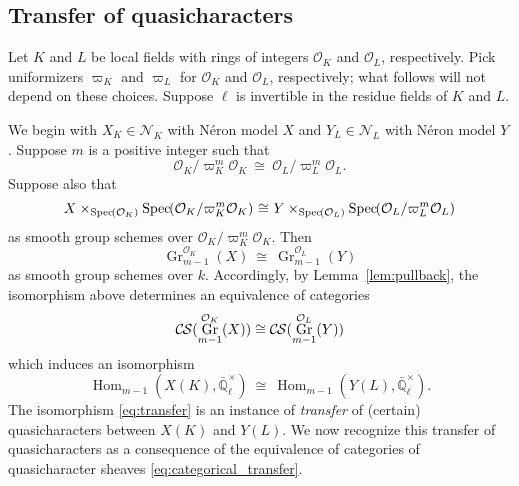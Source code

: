 \documentclass[10pt]{amsart}
\theoremstyle{plain}
\theoremstyle{definition}
\theoremstyle{remark}
\newcommand{\EE}{\mathbb{\bar Q}_\ell}
\newcommand{\OK}{\mathcal{O}_K}
\newcommand{\OL}{\mathcal{O}_L}
\newcommand{\Fq}{k}
\newcommand{\EEx}{\EE^\times}
\DeclareMathOperator{\Hom}{Hom}
\DeclareMathOperator{\Gr}{Gr}
\newcommand{\Spec}[1]{{\operatorname{Spec}\hskip-1pt( #1 )}}
\newcommand{\iso}{{\ \cong\ }}
\newcommand{\CS}{{\mathcal{C\hskip-0.8pt S}}}
\begin{document}
\subsection{Transfer of quasicharacters}\label{ssec:transfer}

Let $K$ and $L$ be local fields with rings of integers $\OK$ and $\OL$, respectively. 
Pick uniformizers $\varpi_K$ and $\varpi_L$ for $\OK$ and $\OL$, respectively;
what follows will not depend on these choices.
Suppose $\ell$ is invertible in the residue fields of $K$ and $L$.

We begin with $X_K\in \mathcal{N}_K$ with N\'eron model $X$ and $Y_{L}\in \mathcal{N}_L$ with N\'eron model $Y$.
Suppose $m$ is a positive integer such that 
\[
\OK/\varpi_K^{m}\OK \iso \OL/\varpi_L^{m}\OL.
\]
Suppose also that
\begin{equation}\label{eq:schematic_transfer}
X \times_{\Spec{\OK}} \Spec{\OK/\varpi_K^{m}\OK} \iso Y \times_{\Spec{\OL}} \Spec{\OL/\varpi_L^{m}\OL}
\end{equation}
as smooth group schemes over $\OK/\varpi_K^{m}\OK$. 
Then
\[
\Gr^{\OK}_{m-1}(X) \iso \Gr^{\OL}_{m-1}(Y)
\]
as smooth group schemes over $\Fq$.  Accordingly, by Lemma~\ref{lem:pullback}, the isomorphism above determines an equivalence of categories
\begin{equation}\label{eq:categorical_transfer}
\CS(\Gr^{\OK}_{m-1}(X)) \cong \CS(\Gr^{\OL}_{m-1}(Y))
\end{equation}
which induces an isomorphism
\begin{equation}\label{eq:transfer}
\Hom_{m-1}(X(K),\EEx)  \iso  \Hom_{m-1}(Y(L),\EEx).
\end{equation}
The isomorphism \eqref{eq:transfer} is an instance of {\it transfer} of (certain) quasicharacters between $X(K)$ and $Y(L)$. 
We now recognize this transfer of quasicharacters as a consequence of the equivalence of categories of quasicharacter sheaves \eqref{eq:categorical_transfer}.
\end{document}
